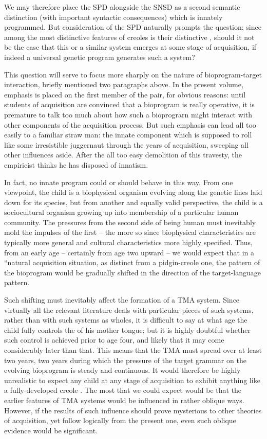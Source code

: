We may therefore place the SPD alongside the SNSD as a second semantic distinction (with important syntactic consequences) which is innately programmed. But consideration of the SPD naturally prompts the question: since among the most distinctive features of creoles is their distinctive , should it not be the case that this or a similar system emerges at some stage of acquisition, if indeed a uni\-versal genetic program generates such a system?

This question will serve to focus more sharply on the nature of bioprogram-target interaction, briefly mentioned two paragraphs above. In the present volume, emphasis is placed on the first member of the pair, for obvious reasons: until students of acquisition are convinced that a bioprogram is really operative, it is premature to talk too much about how such a bioprograrn might interact with other components of the acquisition process. But such emphasis can lead all too easily to a familiar straw man: the innate component which is supposed to roll like some irresistible juggernaut through the years of acquisition, sweeping all other influences aside. After the all too easy demolition of this travesty, the empiricist thinks he has disposed of innatism.

In fact, no innate program could or should behave in this way. From one viewpoint, the child is a biophysical organism evolving along the genetic lines laid down for its species, but from another and equally valid perspective, the child is a sociocultural organism growing up into membership of a particular human community. The pressures from the second side of being human must inevitably mold the impulses of the first -- the more so since biophysical characteristics are typically more general and cultural characteristics more highly specified. Thus, from an early age -- certainly from age two upward -- we would expect that in a ``natural acquisition situation, as distinct from a pidgin-creole one, the pattern of the bioprogram would be gradually shifted in the direction of the target-language pattern.

Such shifting must inevitably affect the formation of a TMA
system. Since virtually all the relevant literature deals with  particular pieces of such systems, rather than with such systems as wholes, it is difficult to say at what age the child fully controls the  of his mother tongue; but it is highly doubtful whether such control is achieved prior to age four, and likely that it may come considerably later than that. This means that the  TMA must spread over at least two years, two years during which the pressure of the target grammar on the evolving bioprogram is steady and continuous. It would therefore be highly unrealistic to expect any child at any stage of acquisition to exhibit anything like a fully-developed creole . The most that we could expect would be that  the earlier features of TMA systems would be influ\-enced in rather oblique ways. However, if the results of such influence should prove mysterious to other theories of acquisition, yet follow logically from the present one, even such oblique evidence would be significant.


